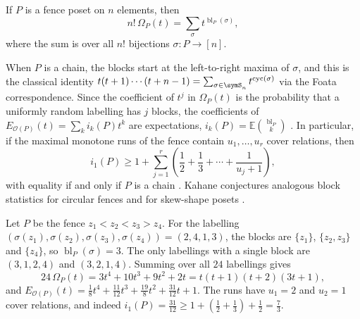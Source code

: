 \begin{theorem}
If \(P\) is a fence poset on \(n\) elements, then
\[
  n!\,\Omega_P(t)=\sum_{\sigma}t^{\operatorname{bl}_P(\sigma)},
\]
where the sum is over all \(n!\) bijections \(\sigma\colon P\to[n]\).
\end{theorem}

When \(P\) is a chain, the blocks start at the left-to-right maxima of
\(\sigma\), and this is the classical identity
\(t(t+1)\dotsm(t+n-1)=\sum_{\sigma\in\symS_n}t^{\operatorname{cyc}(\sigma)}\)
via the Foata correspondence.
Since the coefficient of \(t^j\) in \(\Omega_P(t)\) is the probability that a
uniformly random labelling has \(j\) blocks, the coefficients of
\(E_{\mathcal O(P)}(t)=\sum_k i_k(P)t^k\) are expectations,
\(i_k(P)=\mathbb{E}\binom{\operatorname{bl}_P}{k}\)
\cite[Lem.~5.1]{Kahane2026x}.  In particular, if the maximal monotone runs
of the fence contain \(u_1,\dotsc,u_r\) cover relations, then
\[
  i_1(P)\geq 1+\sum_{j=1}^{r}\left(\frac{1}{2}+\frac{1}{3}+\dotsb+\frac{1}{u_j+1}\right),
\]
with equality if and only if \(P\) is a chain \cite[Thm.~5.3]{Kahane2026x}.
Kahane conjectures analogous block statistics for circular fences and for
skew-shape posets \cite[Conj.~4.3 and Conj.~4.7]{Kahane2026x}.

\begin{example}
Let \(P\) be the fence \(z_1<z_2<z_3>z_4\).  For the labelling
\((\sigma(z_1),\sigma(z_2),\sigma(z_3),\sigma(z_4))=(2,4,1,3)\), the blocks are
\(\{z_1\}\), \(\{z_2,z_3\}\) and \(\{z_4\}\), so
\(\operatorname{bl}_P(\sigma)=3\).  The only labellings with a single block are
\((3,1,2,4)\) and \((3,2,1,4)\).  Summing over all \(24\) labellings gives
\[
  24\,\Omega_P(t)=3t^4+10t^3+9t^2+2t=t(t+1)(t+2)(3t+1),
\]
and
\(E_{\mathcal O(P)}(t)=\tfrac18t^4+\tfrac{11}{12}t^3+\tfrac{19}{8}t^2+\tfrac{31}{12}t+1\).
The runs have \(u_1=2\) and \(u_2=1\) cover relations, and indeed
\(i_1(P)=\tfrac{31}{12}\geq 1+\left(\tfrac12+\tfrac13\right)+\tfrac12=\tfrac73\).
\end{example}

